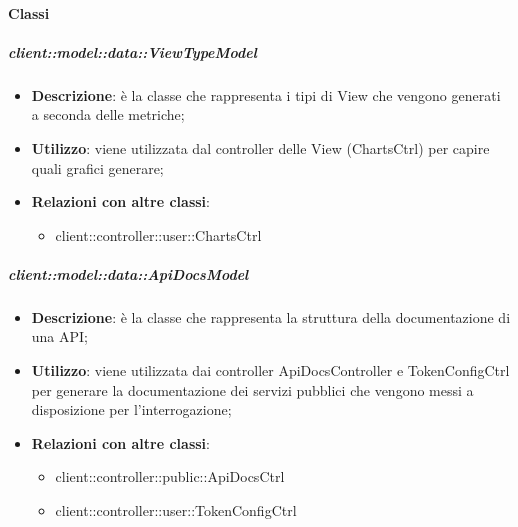 	\paragraph{Classi} %
		\subparagraph{client::model::data::ViewTypeModel} %
		\label{subp:client_model_data_viewtypemodel}
			\begin{itemize}
				\item \textbf{Descrizione}: è la classe che rappresenta i tipi di View che vengono generati a seconda delle metriche;
				\item \textbf{Utilizzo}: viene utilizzata dal controller delle View (ChartsCtrl) per capire quali grafici generare;
				\item \textbf{Relazioni con altre classi}:
					\begin{itemize}
						\item client::controller::user::ChartsCtrl
					\end{itemize}
			\end{itemize}

		\subparagraph{client::model::data::ApiDocsModel} %
		\label{subp:client_model_data_apidocsmodel}
			\begin{itemize}
				\item \textbf{Descrizione}: è la classe che rappresenta la struttura della documentazione di una API;
				\item \textbf{Utilizzo}: viene utilizzata dai controller ApiDocsController e TokenConfigCtrl per generare la documentazione dei servizi pubblici che vengono messi a disposizione per l'interrogazione;
				\item \textbf{Relazioni con altre classi}:
					\begin{itemize}
						\item client::controller::public::ApiDocsCtrl
						\item client::controller::user::TokenConfigCtrl
					\end{itemize}
			\end{itemize}


